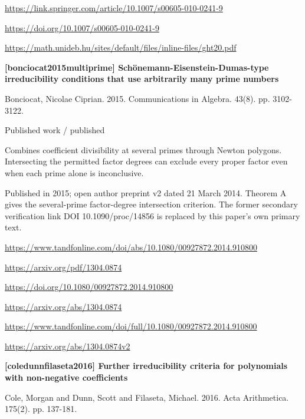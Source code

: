 \documentclass[11pt,a4paper,oneside,openany]{book}
\begin{document}
{\footnotesize\url{https://link.springer.com/article/10.1007/s00605-010-0241-9}}\par
{\footnotesize\url{https://doi.org/10.1007/s00605-010-0241-9}}\par
{\footnotesize\url{https://math.unideb.hu/sites/default/files/inline-files/ght20.pdf}}\par
\vspace{9pt}
\hypertarget{ref:bonciocat2015multiprime}{}
{\sffamily\bfseries\color{atlasgreen}[bonciocat2015multiprime] Schönemann-Eisenstein-Dumas-type irreducibility conditions that use arbitrarily many prime numbers}\par
\color{black} Bonciocat, Nicolae Ciprian. 2015. Communications in Algebra. 43(8). pp. 3102-3122.\par
{\small\sffamily\color{atlasgold}Published work / published}\par
\color{black} Combines coefficient divisibility at several primes through Newton polygons. Intersecting the permitted factor degrees can exclude every proper factor even when each prime alone is inconclusive.\par
{\small Published in 2015; open author preprint v2 dated 21 March 2014. Theorem A gives the several-prime factor-degree intersection criterion. The former secondary verification link DOI 10.1090/proc/14856 is replaced by this paper's own primary text.}\par
{\footnotesize\url{https://www.tandfonline.com/doi/abs/10.1080/00927872.2014.910800}}\par
{\footnotesize\url{https://arxiv.org/pdf/1304.0874}}\par
{\footnotesize\url{https://doi.org/10.1080/00927872.2014.910800}}\par
{\footnotesize\url{https://arxiv.org/abs/1304.0874}}\par
{\footnotesize\url{https://www.tandfonline.com/doi/full/10.1080/00927872.2014.910800}}\par
{\footnotesize\url{https://arxiv.org/abs/1304.0874v2}}\par
\vspace{9pt}
\hypertarget{ref:coledunnfilaseta2016}{}
{\sffamily\bfseries\color{atlasgreen}[coledunnfilaseta2016] Further irreducibility criteria for polynomials with non-negative coefficients}\par
\color{black} Cole, Morgan and Dunn, Scott and Filaseta, Michael. 2016. Acta Arithmetica. 175(2). pp. 137-181.\par
\end{document}

